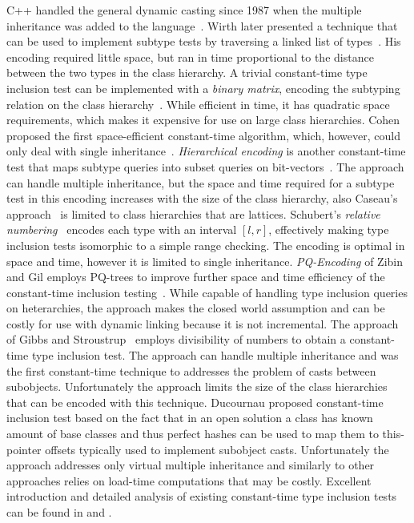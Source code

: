 C++ handled the general dynamic casting since 1987 when the multiple inheritance 
was added to the language~\cite{Str87}. Wirth later presented a technique that 
can be used to implement subtype tests by traversing a linked list of 
types~\cite{Wirth88}. His encoding required little space, but ran in time 
proportional to the distance between the two types in the class hierarchy. 
A trivial constant-time type inclusion test can be implemented with a 
\emph{binary matrix}, encoding the subtyping relation on the class 
hierarchy~\cite{Vortex96}. While efficient in time, it has quadratic space 
requirements, which makes it expensive for use on large class hierarchies. Cohen 
proposed the first space-efficient constant-time algorithm, which, however, could 
only deal with single inheritance~\cite{Cohen91}. \emph{Hierarchical encoding} 
is another constant-time test that maps subtype queries into subset queries on 
bit-vectors~\cite{Caseau93,Krall97nearoptimal}. The approach can handle multiple
inheritance, but the space and time required for a subtype test in this encoding 
increases with the size of the class hierarchy, also Caseau's approach~\cite{Caseau93} is 
limited to class hierarchies that are lattices. Schubert's \emph{relative 
numbering}~\cite{Schubert83} encodes each type with an interval $[l,r]$, 
effectively making type inclusion tests isomorphic to a simple range checking. 
The encoding is optimal in space and time, however it is limited to single 
inheritance. \emph{PQ-Encoding} of Zibin and Gil employs PQ-trees to improve 
further space and time efficiency of the constant-time inclusion 
testing~\cite{PQEncoding}. While capable of handling type inclusion queries on 
heterarchies, the approach makes the closed world assumption and can be costly 
for use with dynamic linking because it is not incremental.
The approach of Gibbs and Stroustrup~\cite{FastDynCast} employs divisibility of 
numbers to obtain a constant-time type inclusion test. The approach can handle 
multiple inheritance and was the first constant-time technique to addresses the 
problem of casts between subobjects. Unfortunately the approach limits the size 
of the class hierarchies that can be encoded with this technique. 
Ducournau proposed constant-time inclusion test based on the fact that in an 
open solution a class has known amount of base classes and thus perfect hashes 
can be used to map them to this-pointer offsets typically used to implement 
subobject casts\cite{Ducournau08}. Unfortunately the approach addresses only 
virtual multiple inheritance and similarly to other approaches relies on 
load-time computations that may be costly. Excellent introduction and detailed 
analysis of existing constant-time type inclusion tests can be found in 
\cite{Vitek97} and \cite{PQEncoding}.

